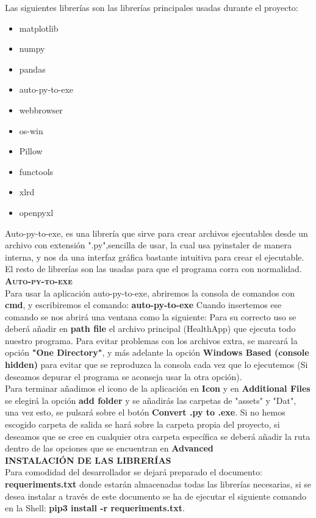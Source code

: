 Las siguientes librerías son las librerías principales usadas durante el proyecto:
\begin{itemize}
\item matplotlib
\item numpy
\item pandas
\item auto-py-to-exe
\item webbrowser
\item os-win
\item Pillow
\item functools
\item xlrd
\item openpyxl
\end{itemize}
Auto-py-to-exe, es una librería que sirve para crear archivos ejecutables desde un archivo con extensión ".py",sencilla de usar, la cual usa pyinstaler de manera interna, y nos da una interfaz gráfica bastante intuitiva para crear el ejecutable. El resto de librerías son las usadas para que el programa corra con normalidad.\\

\textbf{\textsc{Auto-py-to-exe}}\\
Para usar la aplicación auto-py-to-exe, abriremos la consola de comandos con \textbf{cmd}, y escribiremos el comando: \textbf{auto-py-to-exe}
Cuando insertemos ese comando se nos abrirá una ventana como la siguiente:
Para su correcto uso se deberá añadir en \textbf{path file} el archivo principal (HealthApp) que ejecuta todo nuestro programa. Para evitar problemas con los archivos extra, se marcará la opción \textbf{"One Directory"}, y más adelante la opción \textbf{Windows Based (console hidden)} para evitar que se reproduzca la consola cada vez que lo ejecutemos (Si deseamos depurar el programa se aconseja usar la otra opción).\\
Para terminar añadimos el icono de la aplicación en \textbf{Icon} y en \textbf{Additional Files} se elegirá la opción \textbf{add folder} y se añadirás las carpetas de "assets" y "Dat", una vez esto, se pulsará sobre el botón \textbf{Convert .py to .exe}. Si no hemos escogido carpeta de salida se hará sobre la carpeta propia del proyecto, si deseamos que se cree en cualquier otra carpeta específica se deberá añadir la ruta dentro de las opciones que se encuentran en \textbf{Advanced}\\
\pagebreak
\textbf{\textsc{INSTALACIÓN DE LAS LIBRERÍAS}}\\
Para comodidad del desarrollador se dejará preparado el documento: \textbf{requeriments.txt} donde estarán almacenadas todas las librerías necesarias, si se desea instalar a través de este documento se ha de ejecutar el siguiente comando en la Shell: \textbf{pip3 install -r requeriments.txt}.\\


